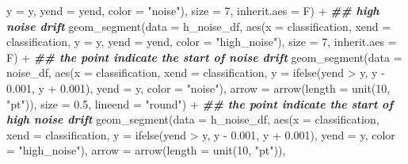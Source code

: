 \documentclass[
]{article}
\newenvironment{Shaded}{\begin{snugshade}}{\end{snugshade}}
\newcommand{\AttributeTok}[1]{\textcolor[rgb]{0.77,0.63,0.00}{#1}}
\newcommand{\DecValTok}[1]{\textcolor[rgb]{0.00,0.00,0.81}{#1}}
\newcommand{\DocumentationTok}[1]{\textcolor[rgb]{0.56,0.35,0.01}{\textbf{\textit{#1}}}}
\newcommand{\FloatTok}[1]{\textcolor[rgb]{0.00,0.00,0.81}{#1}}
\newcommand{\FunctionTok}[1]{\textcolor[rgb]{0.00,0.00,0.00}{#1}}
\newcommand{\NormalTok}[1]{#1}
\newcommand{\SpecialCharTok}[1]{\textcolor[rgb]{0.00,0.00,0.00}{#1}}
\newcommand{\StringTok}[1]{\textcolor[rgb]{0.31,0.60,0.02}{#1}}
\begin{document}
\begin{Shaded}
\begin{Highlighting}[]
                     \AttributeTok{y =}\NormalTok{ y, }\AttributeTok{yend =}\NormalTok{ yend,}
                     \AttributeTok{color =} \StringTok{"noise"}\NormalTok{),}
                   \AttributeTok{size =} \DecValTok{7}\NormalTok{, }
                   \AttributeTok{inherit.aes =}\NormalTok{ F) }\SpecialCharTok{+}
      \DocumentationTok{\#\# high noise drift}
      \FunctionTok{geom\_segment}\NormalTok{(}\AttributeTok{data =}\NormalTok{ h\_noise\_df,}
                 \FunctionTok{aes}\NormalTok{(}\AttributeTok{x =}\NormalTok{ classification, }\AttributeTok{xend =}\NormalTok{ classification,}
                     \AttributeTok{y =}\NormalTok{ y, }\AttributeTok{yend =}\NormalTok{ yend,}
                     \AttributeTok{color =} \StringTok{"high\_noise"}\NormalTok{),}
                   \AttributeTok{size =} \DecValTok{7}\NormalTok{,}
                   \AttributeTok{inherit.aes =}\NormalTok{ F) }\SpecialCharTok{+}
      \DocumentationTok{\#\# the point indicate the start of noise drift}
      \FunctionTok{geom\_segment}\NormalTok{(}\AttributeTok{data =}\NormalTok{ noise\_df,}
                 \FunctionTok{aes}\NormalTok{(}\AttributeTok{x =}\NormalTok{ classification, }\AttributeTok{xend =}\NormalTok{ classification,}
                     \AttributeTok{y =} \FunctionTok{ifelse}\NormalTok{(yend }\SpecialCharTok{\textgreater{}}\NormalTok{ y, y }\SpecialCharTok{{-}} \FloatTok{0.001}\NormalTok{, y }\SpecialCharTok{+} \FloatTok{0.001}\NormalTok{), }\AttributeTok{yend =}\NormalTok{ y,}
                     \AttributeTok{color =} \StringTok{"noise"}\NormalTok{),}
                   \AttributeTok{arrow =} \FunctionTok{arrow}\NormalTok{(}\AttributeTok{length =} \FunctionTok{unit}\NormalTok{(}\DecValTok{10}\NormalTok{, }\StringTok{"pt"}\NormalTok{)),}
                   \AttributeTok{size =} \FloatTok{0.5}\NormalTok{, }\AttributeTok{lineend =} \StringTok{"round"}\NormalTok{) }\SpecialCharTok{+}
      \DocumentationTok{\#\# the point indicate the start of high noise drift}
      \FunctionTok{geom\_segment}\NormalTok{(}\AttributeTok{data =}\NormalTok{ h\_noise\_df,}
                 \FunctionTok{aes}\NormalTok{(}\AttributeTok{x =}\NormalTok{ classification, }\AttributeTok{xend =}\NormalTok{ classification,}
                     \AttributeTok{y =} \FunctionTok{ifelse}\NormalTok{(yend }\SpecialCharTok{\textgreater{}}\NormalTok{ y, y }\SpecialCharTok{{-}} \FloatTok{0.001}\NormalTok{, y }\SpecialCharTok{+} \FloatTok{0.001}\NormalTok{), }\AttributeTok{yend =}\NormalTok{ y,}
                     \AttributeTok{color =} \StringTok{"high\_noise"}\NormalTok{),}
                   \AttributeTok{arrow =} \FunctionTok{arrow}\NormalTok{(}\AttributeTok{length =} \FunctionTok{unit}\NormalTok{(}\DecValTok{10}\NormalTok{, }\StringTok{"pt"}\NormalTok{)),}

\end{Highlighting}
\end{Shaded}
\end{document}
